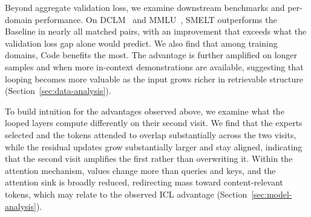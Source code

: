 \documentclass[]{bytedance_seed}
\newcommand{\archname}{SMELT}
\theoremstyle{definition}
\theoremstyle{remark}
\begin{document}
%
Beyond aggregate validation loss, we examine downstream benchmarks and per-domain performance.
%
On DCLM~\cite{li2024datacomp} and MMLU~\cite{hendrycks2021mmlu}, \archname{} outperforms the Baseline in nearly all matched pairs, with an improvement that exceeds what the validation loss gap alone would predict.
%
We also find that among training domains, Code benefits the most.
%
The advantage is further amplified on longer samples and when more in-context demonstrations are available, suggesting that looping becomes more valuable as the input grows richer in retrievable structure (Section~\ref{sec:data-analysis}).

%
To build intuition for the advantages observed above, we examine what the looped layers compute differently on their second visit.
%
We find that the experts selected and the tokens attended to overlap substantially across the two visits, while the residual updates grow substantially larger and stay aligned, indicating that the second visit amplifies the first rather than overwriting it.
%
Within the attention mechanism, values change more than queries and keys, and the attention sink is broadly reduced, redirecting mass toward content-relevant tokens, which may relate to the observed ICL advantage (Section~\ref{sec:model-analysis}).
\end{document}
